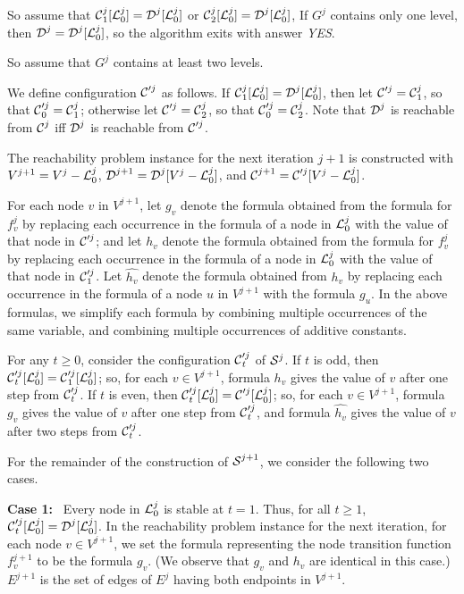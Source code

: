 So assume that $\mbox{$\mathcal{C}$}^j_1[\mbox{$\mathcal{L}$}_0^j] = \mbox{$\mathcal{D}$}^j[\mbox{$\mathcal{L}$}_0^j]$ or $\mbox{$\mathcal{C}$}^j_2[\mbox{$\mathcal{L}$}_0^j] = \mbox{$\mathcal{D}$}^j[\mbox{$\mathcal{L}$}_0^j]$,
If $G^j$ contains only one level, then $\mbox{$\mathcal{D}$}^j = \mbox{$\mathcal{D}$}^j[\mbox{$\mathcal{L}$}_0^j]$,
so the algorithm exits with answer  {\em YES}.

So assume that $G^j$ contains at least two levels.

We define configuration $\mbox{$\mathcal{C}$}'^j$ as follows.
If $\mbox{$\mathcal{C}$}^j_1[\mbox{$\mathcal{L}$}_0^j] = \mbox{$\mathcal{D}$}^j[\mbox{$\mathcal{L}$}_0^j]$, 
then let $\mbox{$\mathcal{C}$}'^j = \mbox{$\mathcal{C}$}^j_1$, so that $\mbox{$\mathcal{C}$}'^j_0 = \mbox{$\mathcal{C}$}^j_1$;
otherwise let $\mbox{$\mathcal{C}$}'^j = \mbox{$\mathcal{C}$}^j_2$, so that $\mbox{$\mathcal{C}$}'^j_0 = \mbox{$\mathcal{C}$}^j_2$.
Note that $\mbox{$\mathcal{D}$}^j$ is reachable from $\mbox{$\mathcal{C}$}^j$ iff 
$\mbox{$\mathcal{D}$}^j$ is reachable from $\mbox{$\mathcal{C}$}'^j$.

The reachability problem instance for the next iteration $j+1$ is constructed with
$V^{j+1} = V^j -\mbox{$\mathcal{L}$}_0^j$,
$\mbox{$\mathcal{D}$}^{j+1} =\mbox{$\mathcal{D}$}^j[V^j -\mbox{$\mathcal{L}$}_0^j]$, and
$\mbox{$\mathcal{C}$}^{j+1} =\mbox{$\mathcal{C}$}'^j[V^j -\mbox{$\mathcal{L}$}_0^j]$.


For each node $v$ in $V^{j+1}$,
let $g_v$ denote the formula obtained from the formula for $f^j_v$ 
by replacing each occurrence in the formula of a node in $\mbox{$\mathcal{L}$}_0^j$
with the value of that node in $\mbox{$\mathcal{C}$}'^j$;
and let $h_v$ denote the formula obtained from the formula for $f^j_v$ 
by replacing each occurrence in the formula of a node in $\mbox{$\mathcal{L}$}_0^j$
with the value of that node in $\mbox{$\mathcal{C}$}'^j_1$.
Let $\hat{h_v}$ denote the formula obtained from $h_v$
by replacing each occurrence in the formula of a node $u$ in $V^{j+1}$
with the formula $g_u$.
In the above formulas, 
we  simplify each formula by combining 
multiple occurrences of the same variable,
and combining multiple occurrences of additive constants.

For any $t \geq 0$, consider the configuration  $\mbox{$\mathcal{C}$}'^j_t$ 
of $\mbox{$\mathcal{S}$}{}^j$.
If $t$ is odd, then $\mbox{$\mathcal{C}$}'^j_t[\mbox{$\mathcal{L}$}_0^j] = \mbox{$\mathcal{C}$}'^j_1[\mbox{$\mathcal{L}$}_0^j]$;
so, for each $v \in V^{j+1} $,
formula $h_v$ gives the value of $v$ after one step from $\mbox{$\mathcal{C}$}'^j_t$.
If $t$ is even, then $\mbox{$\mathcal{C}$}'^j_t[\mbox{$\mathcal{L}$}_0^j] = \mbox{$\mathcal{C}$}'^j[\mbox{$\mathcal{L}$}_0^j]$;
so, for each $v \in V^{j+1} $,
formula $g_v$ gives the value of $v$ after one step from $\mbox{$\mathcal{C}$}'^j_t$,
and formula $\hat{h_v}$ gives the value of $v$ after two steps from $\mbox{$\mathcal{C}$}'^j_t$.

For the remainder of the construction of $\mbox{$\mathcal{S}$}^{j+1} $,
we consider the following two cases.

\noindent
\textbf{Case 1:}~
Every node in $\mbox{$\mathcal{L}$}_0^j$ is stable at $t =1$.
Thus, for all $t \geq 1$, $\mbox{$\mathcal{C}$}'^j_t[\mbox{$\mathcal{L}$}_0^j] = \mbox{$\mathcal{D}$}^j[\mbox{$\mathcal{L}$}_0^j]$.
In the reachability problem instance for the next iteration,
for each node $v \in V^{j+1}$,
we set the formula representing the node transition function $f^{j+1}_v$ 
to be the formula $g_v$.
(We observe that $g_v$ and $h_v$ are identical in this case.)
$E^{j+1}$ is the set of edges of $E^j$ having both endpoints in $V^{j+1}$.


